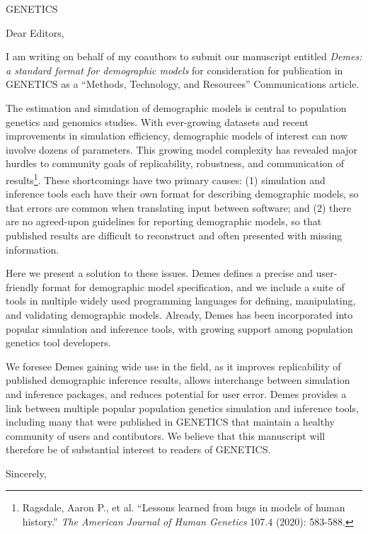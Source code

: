 \documentclass{letter}
\begin{document}
\begin{letter}{GENETICS}

\opening{Dear Editors,}

I am writing on behalf of my coauthors to submit our manuscript entitled
\emph{Demes: a standard format for demographic models}
for consideration for publication in GENETICS
as a ``Methods, Technology, and Resources'' Communications article.

The estimation and simulation of demographic models is central to population
genetics and genomics studies.
With ever-growing datasets and recent improvements in simulation efficiency,
demographic models of interest can now involve dozens of parameters.
This growing model complexity has revealed major hurdles to community
goals of replicability, robustness, and communication of
results\footnote{Ragsdale, Aaron P., et al. ``Lessons learned from bugs in
models of human history.'' \emph{The American Journal of Human Genetics}
107.4 (2020): 583-588.}.
These shortcomings have two primary causes: (1)
simulation and inference tools each have their own format for describing
demographic models, so that errors are common when translating input between
software; and (2) there are no agreed-upon guidelines for reporting demographic
models, so that published results are difficult to reconstruct and
often presented with missing information.

Here we present a solution to these issues. Demes defines a precise
and user-friendly format for demographic model specification, and we include a
suite of tools in multiple widely used programming languages for defining,
manipulating, and validating demographic models. Already, Demes has been
incorporated into popular simulation and inference tools, with growing support
among population genetics tool developers.

We foresee Demes gaining wide use in the field, as it improves replicability of
published demographic inference results, allows interchange between
simulation and inference packages, and reduces potential
for user error. Demes provides
a link between multiple popular population genetics simulation and inference
tools, including many that were published in GENETICS that maintain a
healthy community of users and contibutors. We believe that this manuscript
will therefore
be of substantial interest to readers of GENETICS.

\closing{Sincerely,}

\end{letter}
\end{document}
